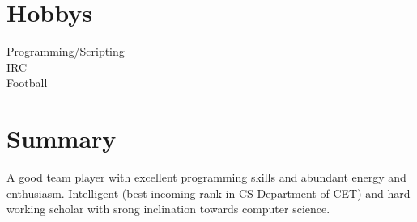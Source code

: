 \documentclass[line,margin]{res}
\begin{document}
\begin{resume}
\section{Hobbys}
Programming/Scripting\\
IRC\\
Football\\

\section{Summary}
A good team player with excellent programming skills and abundant energy  and enthusiasm. Intelligent (best incoming rank in CS Department of CET) and hard working scholar with srong inclination towards computer science.

\end{resume}
\end{document}
